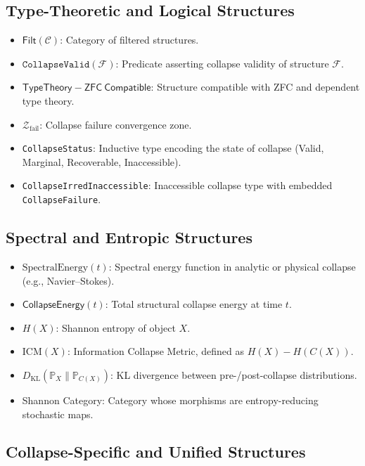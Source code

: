 \documentclass[11pt]{article}
\begin{document}
\subsection*{Type-Theoretic and Logical Structures}

\begin{itemize}
  \item $\mathsf{Filt}(\mathcal{C})$: Category of filtered structures.
  \item $\texttt{CollapseValid}(\mathcal{F})$: Predicate asserting collapse validity of structure $\mathcal{F}$.
  \item $\mathsf{TypeTheory{-}ZFC\ Compatible}$: Structure compatible with ZFC and dependent type theory.
  \item $\mathcal{Z}_{\mathrm{fail}}$: Collapse failure convergence zone.
  \item \texttt{CollapseStatus}: Inductive type encoding the state of collapse (Valid, Marginal, Recoverable, Inaccessible).
  \item \texttt{CollapseIrredInaccessible}: Inaccessible collapse type with embedded \texttt{CollapseFailure}.
\end{itemize}

\subsection*{Spectral and Entropic Structures}

\begin{itemize}
  \item $\mathrm{SpectralEnergy}(t)$: Spectral energy function in analytic or physical collapse (e.g., Navier–Stokes).
  \item $\mathsf{CollapseEnergy}(t)$: Total structural collapse energy at time $t$.
  \item $H(X)$: Shannon entropy of object $X$.
  \item $\mathrm{ICM}(X)$: Information Collapse Metric, defined as $H(X) - H(C(X))$.
  \item $D_{\mathrm{KL}}(\mathbb{P}_X \| \mathbb{P}_{C(X)})$: KL divergence between pre-/post-collapse distributions.
  \item Shannon Category: Category whose morphisms are entropy-reducing stochastic maps.
\end{itemize}

\subsection*{Collapse-Specific and Unified Structures}
\end{document}
